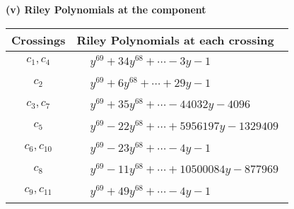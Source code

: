 \documentclass[1p]{elsarticle_modified}
\theoremstyle{definition}
\begin{document}
\newpage\renewcommand{\arraystretch}{1}
\flushleft \textbf{(v) Riley Polynomials at the component}\newline \\
\begin{tabular}{m{50pt}|m{274pt}}
Crossings & \hspace{64pt}Riley Polynomials at each crossing \\
\hline $$\begin{aligned}c_{1},c_{4}\end{aligned}$$&$\begin{aligned}
&y^{69}+34 y^{68}+\cdots-3 y-1
\end{aligned}$\\
\hline $$\begin{aligned}c_{2}\end{aligned}$$&$\begin{aligned}
&y^{69}+6 y^{68}+\cdots+29 y-1
\end{aligned}$\\
\hline $$\begin{aligned}c_{3},c_{7}\end{aligned}$$&$\begin{aligned}
&y^{69}+35 y^{68}+\cdots-44032 y-4096
\end{aligned}$\\
\hline $$\begin{aligned}c_{5}\end{aligned}$$&$\begin{aligned}
&y^{69}-22 y^{68}+\cdots+5956197 y-1329409
\end{aligned}$\\
\hline $$\begin{aligned}c_{6},c_{10}\end{aligned}$$&$\begin{aligned}
&y^{69}-23 y^{68}+\cdots-4 y-1
\end{aligned}$\\
\hline $$\begin{aligned}c_{8}\end{aligned}$$&$\begin{aligned}
&y^{69}-11 y^{68}+\cdots+10500084 y-877969
\end{aligned}$\\
\hline $$\begin{aligned}c_{9},c_{11}\end{aligned}$$&$\begin{aligned}
&y^{69}+49 y^{68}+\cdots-4 y-1
\end{aligned}$\\
\hline
\end{tabular}\\~\\
\end{document}

